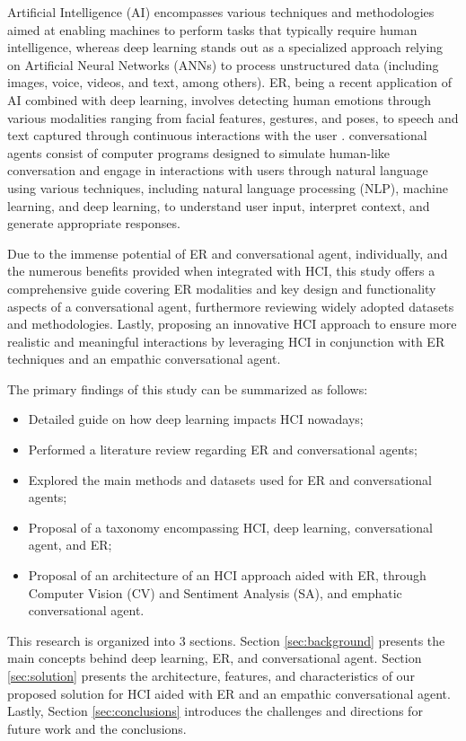 \documentclass[runningheads]{llncs}
\begin{document}
Artificial Intelligence (AI) encompasses various techniques and methodologies aimed at enabling machines to perform tasks that typically require human intelligence, whereas deep learning stands out as a specialized approach relying on Artificial Neural Networks (ANNs) to process unstructured data (including images, voice, videos, and text, among others). ER, being a recent application of AI combined with deep learning, involves detecting human emotions through various modalities ranging from facial features, gestures, and poses, to speech and text captured through continuous interactions with the user \cite{alrowais_modified_2023}.  conversational agents consist of computer programs designed to simulate human-like conversation and engage in interactions with users through natural language using various techniques, including natural language processing (NLP), machine learning, and deep learning, to understand user input, interpret context, and generate appropriate responses.
 
Due to the immense potential of ER and conversational agent, individually, and the numerous benefits provided when integrated with HCI, this study offers a comprehensive guide covering ER modalities and key design and functionality aspects of a conversational agent, furthermore reviewing widely adopted datasets and methodologies. Lastly, proposing an innovative HCI approach to ensure more realistic and meaningful interactions by leveraging HCI in conjunction with ER techniques and an empathic conversational agent.
 
The primary findings of this study can be summarized as follows:
\begin{itemize}
	\item Detailed guide on how deep learning impacts HCI nowadays;
	\item Performed a literature review regarding ER and conversational agents;
	\item Explored the main methods and datasets used for ER and conversational agents;
	\item Proposal of a taxonomy encompassing HCI, deep learning, conversational agent, and ER;
	\item Proposal of an architecture of an HCI approach aided with ER, through Computer Vision (CV) and Sentiment Analysis (SA), and emphatic conversational agent.
\end{itemize}

This research is organized into 3 sections. Section \ref{sec:background} presents the main concepts behind deep learning, ER, and conversational agent. Section \ref{sec:solution} presents the architecture, features, and characteristics of our proposed solution for HCI aided with ER and an empathic conversational agent. Lastly, Section \ref{sec:conclusions}  introduces the challenges and directions for future work and the conclusions. 
\end{document}
